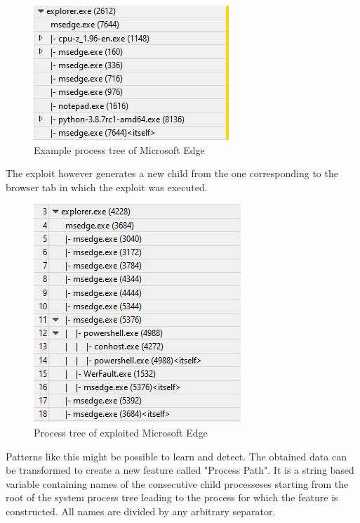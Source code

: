 \documentclass[a4paper,twoside,12pt]{book}
\begin{document}
\begin{figure}
	\centering
	\includegraphics{images/wpa_normal}
	\caption{Example process tree of Microsoft Edge}
	\label{fig:WPAnormal}
 \end{figure}

The exploit however generates a new child from the one corresponding to the browser tab 
in which the exploit was executed. 

\begin{figure}
	\centering
	\includegraphics{images/wpa_exploit}
	\caption{Process tree of exploited Microsoft Edge}
	\label{fig:WPAexploit}
 \end{figure}

Patterns like this might be possible to learn and detect. The obtained data can be transformed
to create a new feature called "Process Path". It is a string based variable containing names 
of the consecutive child processeses starting from the root of the system process tree leading to the 
process for which the feature is constructed. All names are divided by any arbitrary separator. 
\end{document}
